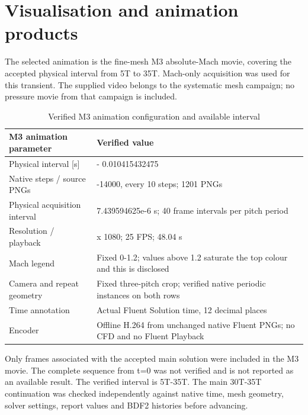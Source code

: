 \documentclass[11pt,a4paper]{article}
\begin{document}
\FloatBarrier
\section{Visualisation and animation products}
The selected animation is the fine-mesh M3 absolute-Mach movie, covering the accepted physical interval from 5T to 35T. Mach-only acquisition was used for this transient. The supplied video belongs to the systematic mesh campaign; no pressure movie from that campaign is included.\par

\par
\begin{table}[!htbp]
\centering
\caption{Verified M3 animation configuration and available interval}
\label{tab:15}
\small\renewcommand{\arraystretch}{1.16}
\begin{tabularx}{\linewidth}{@{}>{\raggedright\arraybackslash}X >{\raggedright\arraybackslash}X@{}}
\toprule
\textbf{M3 animation parameter} & \textbf{Verified value} \\
\midrule
Physical interval [s] & 0.001487918925 - 0.010415432475 \\
Native steps / source PNGs & 2000-14000, every 10 steps; 1201 PNGs \\
Physical acquisition interval & 7.439594625e-6 s; 40 frame intervals per pitch period \\
Resolution / playback & 1920 x 1080; 25 FPS; 48.04 s \\
Mach legend & Fixed 0-1.2; values above 1.2 saturate the top colour and this is disclosed \\
Camera and repeat geometry & Fixed three-pitch crop; verified native periodic instances on both rows \\
Time annotation & Actual Fluent Solution time, 12 decimal places \\
Encoder & Offline H.264 from unchanged native Fluent PNGs; no CFD and no Fluent Playback \\
\bottomrule
\end{tabularx}
\end{table}
\par
Only frames associated with the accepted main solution were included in the M3 movie. The complete sequence from t=0 was not verified and is not reported as an available result. The verified interval is 5T-35T. The main 30T-35T continuation was checked independently against native time, mesh geometry, solver settings, report values and BDF2 histories before advancing.\par
\end{document}
